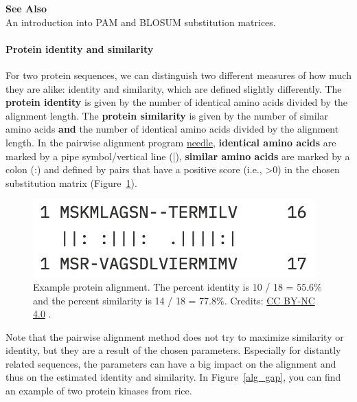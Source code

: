 \begin{framed}
\textbf{See Also}\\
An introduction into PAM and BLOSUM substitution matrices.
\end{framed}

\paragraph{Protein identity and similarity}

For two protein sequences, we can distinguish two different measures of how much they are alike: identity and similarity, which are defined slightly differently.
The \textbf{protein identity} is given by the number of identical amino acids divided by the alignment length.
The \textbf{protein similarity} is given by the number of similar amino acids \textbf{and} the number of identical amino acids divided by the alignment length.
In the pairwise alignment program \href{https://www.ebi.ac.uk/jdispatcher/psa/emboss\_needle}{needle}, \textbf{identical amino acids} are marked by a pipe symbol/vertical line (|), \textbf{similar amino acids} are marked by a colon (:) and defined by pairs that have a positive score (i.e., \textgreater 0) in the chosen substitution matrix (Figure~\ref{aa_sim}).

\begin{figure}[!htbp]
\centering
\includegraphics[width=0.6\linewidth]{files/aa_sim-813512ae657cda606e163020688689f4.png}
\caption[]{Example protein alignment. The percent identity is 10 / 18 = 55.6\% and the percent similarity is 14 / 18 = 77.8\%.
Credits: \href{https://creativecommons.org/licenses/by-nc/4.0/}{CC BY-NC 4.0} \cite{own_2_2024}.}
\label{aa_sim}
\end{figure}

Note that the pairwise alignment method does not try to maximize similarity or identity, but they are a result of the chosen parameters.
Especially for distantly related sequences, the parameters can have a big impact on the alignment and thus on the estimated identity and similarity.
In Figure~\ref{alg_gap}, you can find an example of two protein kinases from rice.

